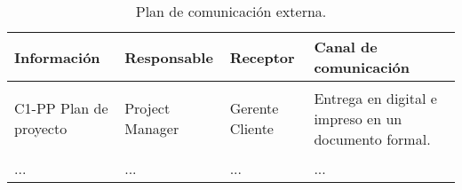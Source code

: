 \begin{table}[hbtp!]
    \noindent\begin{tabular}{|p{}|p{}|p{}|p{}|}
    	\hline
    	{\bf Información} & {\bf Responsable} & {\bf Receptor} & {\bf Canal de comunicación}\\
    	\hline
    	C1-PP Plan de proyecto & Project Manager &
    \begin{Titemize}
    	\Titem Gerente
    	\Titem Cliente 
    \end{Titemize}
     & Entrega en digital e impreso en un documento formal.\\
    	\hline	 
    	... & ... & ... & ... \\
    	\hline
    \end{tabular}
	\caption{Plan de comunicación externa.}
	\label{tbl:planComunicacionExt}
\end{table}

